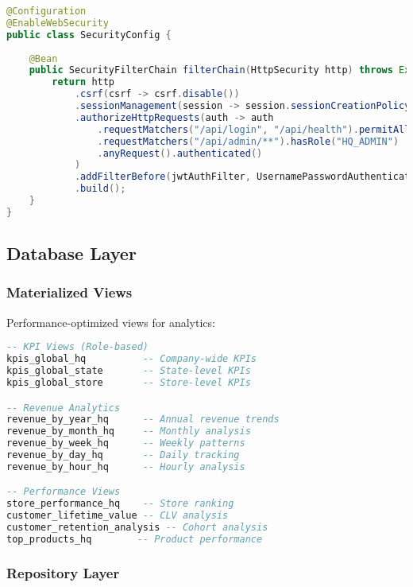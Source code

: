 \documentclass[11pt,a4paper]{article}
\begin{document}
\begin{lstlisting}[language=java, caption=Security Configuration]
@Configuration
@EnableWebSecurity
public class SecurityConfig {
    
    @Bean
    public SecurityFilterChain filterChain(HttpSecurity http) throws Exception {
        return http
            .csrf(csrf -> csrf.disable())
            .sessionManagement(session -> session.sessionCreationPolicy(STATELESS))
            .authorizeHttpRequests(auth -> auth
                .requestMatchers("/api/login", "/api/health").permitAll()
                .requestMatchers("/api/admin/**").hasRole("HQ_ADMIN")
                .anyRequest().authenticated()
            )
            .addFilterBefore(jwtAuthFilter, UsernamePasswordAuthenticationFilter.class)
            .build();
    }
}
\end{lstlisting}

\subsection{Database Layer}

\subsubsection{Materialized Views}
Performance-optimized views for analytics:

\begin{lstlisting}[language=sql, caption=Key Materialized Views]
-- KPI Views (Role-based)
kpis_global_hq          -- Company-wide KPIs
kpis_global_state       -- State-level KPIs  
kpis_global_store       -- Store-level KPIs

-- Revenue Analytics
revenue_by_year_hq      -- Annual revenue trends
revenue_by_month_hq     -- Monthly analysis
revenue_by_week_hq      -- Weekly patterns
revenue_by_day_hq       -- Daily tracking
revenue_by_hour_hq      -- Hourly analysis

-- Performance Views
store_performance_hq    -- Store ranking
customer_lifetime_value -- CLV analysis
customer_retention_analysis -- Cohort analysis
top_products_hq        -- Product performance
\end{lstlisting}

\subsubsection{Repository Layer}
\end{document}

